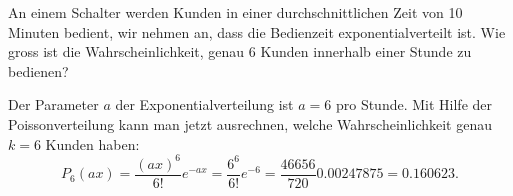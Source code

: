 An einem Schalter werden Kunden in einer durchschnittlichen
Zeit von 10 Minuten bedient, wir nehmen an, dass die Bedienzeit
exponentialverteilt ist. Wie gross ist die Wahrscheinlichkeit,
genau 6 Kunden innerhalb einer Stunde zu bedienen?

\begin{loesung}
Der Parameter $a$ der Exponentialverteilung ist $a=6$ pro Stunde.
Mit Hilfe der Poissonverteilung kann man jetzt ausrechnen,
welche Wahrscheinlichkeit genau $k=6$ Kunden haben:
\[
P_6(ax)=\frac{(ax)^6}{6!}e^{-ax}=\frac{6^6}{6!}e^{-6}
=\frac{46656}{720}0.00247875
=0.160623.
\]
\end{loesung}
